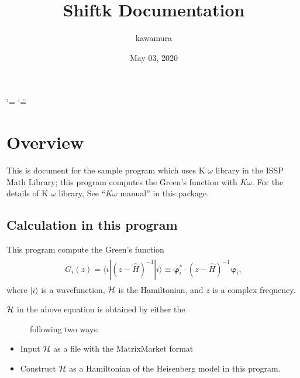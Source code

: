 \documentclass[letterpaper,10pt,dvipdfmx,openany,english]{sphinxmanual}
\title{Shiftk Documentation}
\date{May 03, 2020}
\author{kawamura}
\begin{document}
\ifdefined\shorthandoff
  \ifnum\catcode`\=\string=\active\shorthandoff{=}\fi
  \ifnum\catcode`\"=\active{}\fi
\fi

\pagestyle{empty}
\sphinxmaketitle
\pagestyle{plain}
\sphinxtableofcontents
\pagestyle{normal}
\label{\detokenize{index::doc}}



\chapter{Overview}
\label{\detokenize{shiftk_overview_en:overview}}\label{\detokenize{shiftk_overview_en::doc}}
This is document for the sample program which uses
K \(\omega\) library in the ISSP Math Library;
this program computes the Green’s function with \(K\omega\).
For the details of K \(\omega\) library, See
“\(K\omega\) manual” in this package.


\section{Calculation in this program}
\label{\detokenize{shiftk_overview_en:calculation-in-this-program}}
This program compute the Green’s function
\begin{equation*}
\begin{split}\begin{align}
G_{i}(z) =
\langle i | (z-{\hat H})^{-1}| i \rangle
\equiv
{\boldsymbol \varphi}_i^{*} \cdot (z-{\hat H})^{-1} {\boldsymbol \varphi}_i,
\end{align}\end{split}
\end{equation*}
where \(| i \rangle\) is a wavefunction,
\({\cal H}\) is the Hamiltonian, and
\(z\) is a complex frequency.
\begin{description}
\item[{\({\cal H}\) in the above equation is obtained by either the}] \leavevmode
following two ways:

\end{description}
\begin{itemize}
\item {} 
Input \({\cal H}\) as a file with the MatrixMarket format

\item {} 
Construct \({\cal H}\) as a Hamiltonian of the
Heisenberg model in this program.

\end{itemize}
\end{document}
